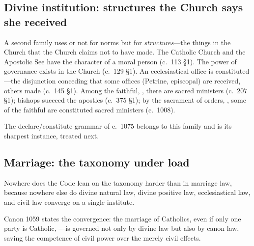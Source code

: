 \subsection{Divine institution: structures the Church says she received}

A second family uses  or  not for norms but for \emph{structures}---the things in the Church that the Church claims not to have made. The Catholic Church and the Apostolic See have the character of a moral person  (c.~113 §1). The power of governance exists in the Church  (c.~129 §1). An ecclesiastical office is constituted ---the disjunction conceding that some offices (Petrine, episcopal) are received, others made (c.~145 §1). Among the faithful, , there are sacred ministers (c.~207 §1); bishops succeed the apostles  (c.~375 §1); by the sacrament of orders, , some of the faithful are constituted sacred ministers (c.~1008).

The declare/constitute grammar of c.~1075 belongs to this family and is its sharpest instance, treated next.

\subsection{Marriage: the taxonomy under load}

Nowhere does the Code lean on the taxonomy harder than in marriage law, because nowhere else do divine natural law, divine positive law, ecclesiastical law, and civil law converge on a single institute.

Canon 1059 states the convergence: the marriage of Catholics, even if only one party is Catholic, ---is governed not only by divine law but also by canon law, saving the competence of civil power over the merely civil effects.

